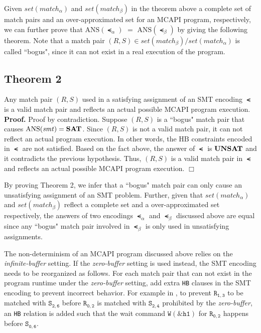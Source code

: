 Given $\mathit{set(match_{\alpha})}$ and $\mathit{set(match_{\beta})}$ in the theorem above a complete set of match pairs and an over-approximated set for an MCAPI program, respectively, we can further prove that $\mathrm{ANS}(\smt_{\alpha})$ $ = $ $\mathrm{ANS}(\smt_{\beta})$ by giving the following theorem. Note that a match pair $(R, S) \in \mathit{set(match_{\beta})}/\mathit{set(match_{\alpha})}$ is called ``bogus", since it can not exist in a real execution of the program.

\subsection{Theorem 2}
Any match pair $(R, S)$ used in a satisfying assignment of an SMT encoding $\smt$ is a valid match pair and reflects an actual possible MCAPI program execution.
\\
\textbf{Proof.}
Proof by contradiction. Suppose $(R, S)$ is a ``bogus" match pair that causes $\mathrm{ANS}(\mathit{smt}) = \textbf{SAT}$. Since $(R, S)$ is not a valid match pair, it can not reflect an actual program execution. In other words, the $\mathrm{HB}$ constraints encoded in $\smt$ are not satisfied. Based on the fact above, the answer of $\smt$ is $\textbf{UNSAT}$ and it contradicts the previous hypothesis. Thus, $(R, S)$ is a valid match pair in $\smt$ and reflects an actual possible MCAPI program execution. $\Box$ 

By proving Theorem 2, we infer that a ``bogus" match pair can only cause an unsatisfying assignment of an SMT problem. Further, given that $\mathit{set(match_{\alpha})}$ and $\mathit{set(match_{\beta})}$ reflect a complete set and a over-approximated set respectively, the answers of two encodings $\smt_{\alpha}$ and $\smt_{\beta}$ discussed above are equal since any ``bogus" match pair involved in $\smt_{\beta}$ is only used in unsatisfying assignments.

The non-determinism of an MCAPI program discussed above relies on the \textit{infinite-buffer} setting. If the \textit{zero-buffer} setting is used instead, the SMT encoding needs to be reorganized as follows. For each match pair that can not exist in the program runtime under the \textit{zero-buffer} setting, add extra \texttt{HB} clauses in the SMT encoding to prevent incorrect behavior. For example in , to prevent $\mathtt{R_{1,3}}$ to be matched with $\mathtt{S_{2,6}}$ before $\mathtt{R_{0,2}}$ is matched with $\mathtt{S_{2,4}}$ prohibited by the \textit{zero-buffer}, an \texttt{HB} relation is added such that the wait command $\mathtt{W(\&h1)}$ for $\mathtt{R_{0,2}}$ happens before $\mathtt{S_{0,6}}$.














